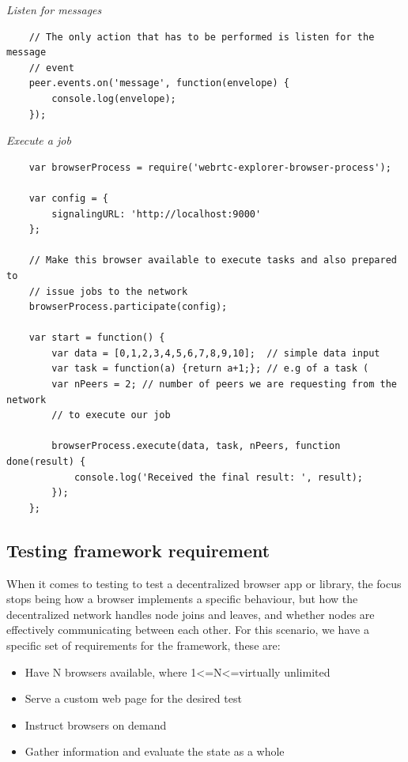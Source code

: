 \textit{Listen for messages}
\begingroup
\scriptsize
\begin{verbatim}
    // The only action that has to be performed is listen for the message 
    // event
    peer.events.on('message', function(envelope) {
        console.log(envelope);
    });
\end{verbatim}
\endgroup

\textit{Execute a job}
\begingroup
\scriptsize
\begin{verbatim}
    var browserProcess = require('webrtc-explorer-browser-process');

    var config = {
        signalingURL: 'http://localhost:9000'
    };

    // Make this browser available to execute tasks and also prepared to 
    // issue jobs to the network
    browserProcess.participate(config);

    var start = function() {
        var data = [0,1,2,3,4,5,6,7,8,9,10];  // simple data input
        var task = function(a) {return a+1;}; // e.g of a task (
        var nPeers = 2; // number of peers we are requesting from the network
        // to execute our job

        browserProcess.execute(data, task, nPeers, function done(result) {
            console.log('Received the final result: ', result);
        });
    };
\end{verbatim}
\endgroup

\subsection{Testing framework requirement}

When it comes to testing to test a decentralized browser app or library, the focus stops being how a browser implements a specific behaviour, but how the decentralized network handles node joins and leaves, and whether nodes are effectively communicating between each other. For this scenario, we have a specific set of requirements for the framework, these are:

\begin{itemize}
    \item Have N browsers available, where 1\textless=N\textless=virtually unlimited 
    \item Serve a custom web page for the desired test 
    \item Instruct browsers on demand 
    \item Gather information and evaluate the state as a whole 
\end{itemize}

